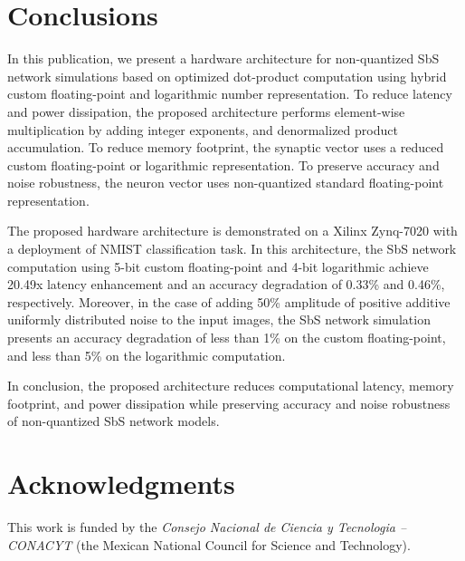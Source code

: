 \section{Conclusions}
\label{sec:conclusions}
In this publication, we present a hardware architecture for non-quantized SbS network simulations based on optimized dot-product computation using hybrid custom floating-point and logarithmic number representation. To reduce latency and power dissipation, the proposed architecture performs element-wise multiplication by adding integer exponents, and denormalized product accumulation. To reduce memory footprint, the synaptic vector uses a reduced custom floating-point or logarithmic representation. To preserve accuracy and noise robustness, the neuron vector uses non-quantized standard floating-point representation.

The proposed hardware architecture is demonstrated on a Xilinx Zynq-7020 with a deployment of NMIST classification task. In this architecture, the SbS network computation using 5-bit custom floating-point and 4-bit logarithmic achieve 20.49x latency enhancement and an accuracy degradation of 0.33\% and 0.46\%, respectively. Moreover, in the case of adding 50\% amplitude of positive additive uniformly distributed noise to the input images, the SbS network simulation presents an accuracy degradation of less than 1\% on the custom floating-point, and less than 5\% on the logarithmic computation.

In conclusion, the proposed architecture reduces computational latency, memory footprint, and power dissipation while preserving accuracy and noise robustness of non-quantized SbS network models.

\section * {Acknowledgments}\label{sec:Ack}
This work is funded by the \textit{Consejo Nacional de Ciencia y Tecnologia -- CONACYT} (the Mexican National Council for Science and Technology).
